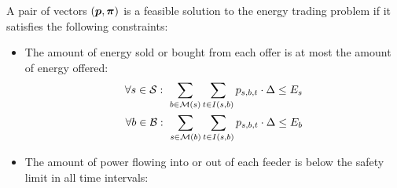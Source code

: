 A pair of vectors $(\boldsymbol{p}, \boldsymbol{\pi})$ is a feasible solution to the energy trading problem if it satisfies the following constraints:
\begin{itemize}
\item The amount of energy sold or bought from each offer is at most the amount of energy offered:
\begin{align}
\forall s \in \calS: ~ \sum_{b \in \calM(s)} \sum_{t \in I(s,b)} p_{s,b,t} \cdot \Delta \leq E_s \label{eq:constrEnergyProd} \\
\forall b \in \calB: ~ \sum_{s \in \calM(b)} \sum_{t \in I(s,b)} p_{s,b,t} \cdot \Delta \leq E_b \label{eq:constrEnergyCons} 
\end{align}
\item The amount of power flowing into or out of each feeder is below the safety limit in all time intervals:

\end{itemize}
